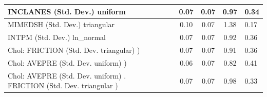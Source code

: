 \begin{table}
\begin{center}
\begin{tabular}{|l|l|c|c|c|l|}
			\hline
			INCLANES (Std. Dev.) uniform &  & 0.07 & 0.07 & 0.97 & 0.34 \\
			\hline
			MIMEDSH (Std. Dev.) triangular &  & 0.10 & 0.07 & 1.38 & 0.17 \\
			\hline
			INTPM (Std. Dev.) ln_normal &  & 0.07 & 0.07 & 0.92 & 0.36 \\
			\hline
			 Chol: FRICTION (Std. Dev. triangular) ) &  & 0.07 & 0.07 & 0.91 & 0.36 \\
			\hline
			 Chol: AVEPRE (Std. Dev. uniform) ) &  & 0.06 & 0.07 & 0.82 & 0.41 \\
			\hline
			 Chol: AVEPRE (Std. Dev. uniform) . FRICTION (Std. Dev.   triangular ) &  & 0.07 & 0.07 & 0.98 & 0.33 \\
			\hline
		\end{tabular}
	\end{center}
\end{table}